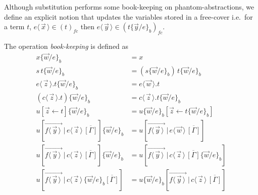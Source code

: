 \documentclass[a4paper,UKenglish,cleveref, autoref]{lipics-v2019}
\newcommand{\fc}[1]{(#1)_{fc}}
\newcommand{\app}[2]{#1 \, #2}
\newcommand{\fake}[3]{#1 \langle \, #2 \, \rangle . #3}
\newcommand{\share}[3]{#1 [#2 \leftarrow #3]}
\newcommand{\dist}[5]{#1 [ #2 \, \vert \, \fakedist{#4}{#5} \, #3 ]}
\newcommand{\fakedist}[2]{#1 \langle \, #2 \, \rangle}
\newcommand{\vecdist}[2]{\overrightarrow{\fakedist{#1}{#2} \,}}
\newcommand{\psub}[3]{#1 \{ #2 / #3 \}_{b}}
\begin{document}
Although substitution performs some book-keeping on phantom-abstractions, we define an explicit notion that updates the variables stored in a free-cover i.e.\ for a term $t$, $\fakedist{e}{\vec{x}} \in \fc{t}$ then $\fakedist{e}{\vec{y}} \in \fc{\psub{t}{\vec{y}}{e}}$.

\begin{definition} The operation \emph{book-keeping} is defined as
\label{def:bk}
\begingroup
\allowdisplaybreaks
	\begin{align*}
		\psub{x}{\vec{w}}{e} &= x \\
		\psub{\app{s}{t}}{\vec{w}}{e} &= \app{(\psub{s}{\vec{w}}{e})}{\psub{t}{\vec{w}}{e}} \\
		\psub{\fake{e}{\vec{z}}{t}}{\vec{w}}{e} &= \fake{e}{\vec{w}}{t} \\
		\psub{(\fake{c}{\vec{z}}{t})}{\vec{w}}{e} &= \fake{c}{\vec{z}}{\psub{t}{\vec{w}}{e}} \\
		\psub{\share{u}{\vec{z}}{t}}{\vec{w}}{e} &= \share{\psub{u}{\vec{w}}{e}}{\vec{z}}{\psub{t}{\vec{w}}{e}} \\
		\psub{\dist{u}{\vecdist{f}{\vec{y}}}{\overline{[\Gamma]}}{e}{\vec{z}}}{\vec{w}}{e} &= \dist{u}{\vecdist{f}{\vec{y}}}{\overline{[\Gamma]}}{e}{\vec{w}} \\
		\psub{\dist{u}{\vecdist{f}{\vec{y}}}{\overline{[\Gamma]}}{c}{\vec{z}}}{\vec{w}}{e} &= \dist{u}{\vecdist{f}{\vec{y}}}{\overline{[\Gamma]} \psub{}{\vec{w}}{e}}{c}{\vec{z}} \\
		\dist{u}{\vecdist{f}{\vec{y}}}{\psub{}{\vec{w}}{e}\overline{[\Gamma]}}{c}{\vec{z}} &= \dist{\psub{u}{\vec{w}}{e}}{\vecdist{f}{\vec{y}}}{\overline{[\Gamma]}}{c}{\vec{z}}
	\end{align*}
\endgroup
\end{definition}
\end{document}
